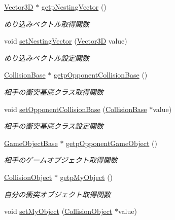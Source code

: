 \begin{DoxyCompactItemize}
\mbox{\hyperlink{class_vector3_d}{Vector3D}} $\ast$ \mbox{\hyperlink{class_collision_information_abcecc42b221dd5d45abdee5189c90fab}{getp\+Nesting\+Vector}} ()
\begin{DoxyCompactList}\small\item\em めり込みベクトル取得関数 \end{DoxyCompactList}\item 
void \mbox{\hyperlink{class_collision_information_ad0233e1e4f322e3209d8a74c10d142c8}{set\+Nesting\+Vector}} (\mbox{\hyperlink{class_vector3_d}{Vector3D}} value)
\begin{DoxyCompactList}\small\item\em めり込みベクトル設定関数 \end{DoxyCompactList}\item 
\mbox{\hyperlink{class_collision_base}{Collision\+Base}} $\ast$ \mbox{\hyperlink{class_collision_information_a957c277459c059bf43d344c23474820c}{getp\+Opponent\+Collision\+Base}} ()
\begin{DoxyCompactList}\small\item\em 相手の衝突基底クラス取得関数 \end{DoxyCompactList}\item 
void \mbox{\hyperlink{class_collision_information_a57cff995a5a2ee46e518daeb0440984a}{set\+Opponent\+Collision\+Base}} (\mbox{\hyperlink{class_collision_base}{Collision\+Base}} $\ast$value)
\begin{DoxyCompactList}\small\item\em 相手の衝突基底クラス設定関数 \end{DoxyCompactList}\item 
\mbox{\hyperlink{class_game_object_base}{Game\+Object\+Base}} $\ast$ \mbox{\hyperlink{class_collision_information_af0182f7a9bb517b4a10a0e1e22a0b972}{getp\+Opponent\+Game\+Object}} ()
\begin{DoxyCompactList}\small\item\em 相手のゲームオブジェクト取得関数 \end{DoxyCompactList}\item 
\mbox{\hyperlink{class_collision_object}{Collision\+Object}} $\ast$ \mbox{\hyperlink{class_collision_information_a53fef8b0eee1d30e6a46b6f1d7c59369}{getp\+My\+Object}} ()
\begin{DoxyCompactList}\small\item\em 自分の衝突オブジェクト取得関数 \end{DoxyCompactList}\item 
void \mbox{\hyperlink{class_collision_information_a764e1ea84bdad4c3a99e2a360d759550}{set\+My\+Object}} (\mbox{\hyperlink{class_collision_object}{Collision\+Object}} $\ast$value)

\end{DoxyCompactItemize}
